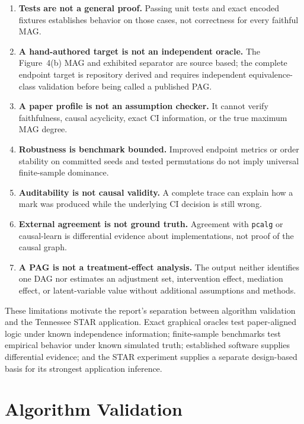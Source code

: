 \documentclass[11pt,a4paper,oneside]{report}
\newcommand{\code}[1]{\texttt{#1}}
\begin{document}
\begin{enumerate}[leftmargin=2em]
  \item \textbf{Tests are not a general proof.}  Passing unit tests and exact
        encoded fixtures establishes behavior on those cases, not correctness
        for every faithful MAG.
  \item \textbf{A hand-authored target is not an independent oracle.}  The
        Figure~4(b) MAG and exhibited separator are source based; the complete
        endpoint target is repository derived and requires independent
        equivalence-class validation before being called a published PAG.
  \item \textbf{A paper profile is not an assumption checker.}  It cannot
        verify faithfulness, causal acyclicity, exact CI information, or the
        true maximum MAG degree.
  \item \textbf{Robustness is benchmark bounded.}  Improved endpoint metrics
        or order stability on committed seeds and tested permutations do not
        imply universal finite-sample dominance.
  \item \textbf{Auditability is not causal validity.}  A complete trace can
        explain how a mark was produced while the underlying CI decision is
        still wrong.
  \item \textbf{External agreement is not ground truth.}  Agreement with
        \code{pcalg} or causal-learn is differential evidence about
        implementations, not proof of the causal graph.
  \item \textbf{A PAG is not a treatment-effect analysis.}  The output neither
        identifies one DAG nor estimates an adjustment set, intervention
        effect, mediation effect, or latent-variable value without additional
        assumptions and methods.
\end{enumerate}

These limitations motivate the report's separation between algorithm
validation and the Tennessee STAR application.  Exact graphical oracles test
paper-aligned logic under known independence information; finite-sample
benchmarks test empirical behavior under known simulated truth; established
software supplies differential evidence; and the STAR experiment supplies a
separate design-based basis for its strongest application inference.

\chapter{Algorithm Validation}
\end{document}

